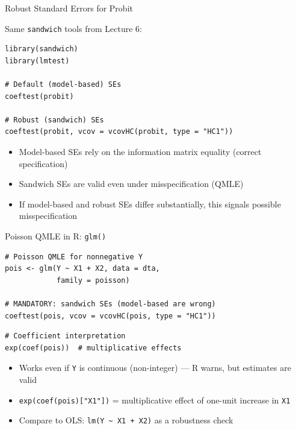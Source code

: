 \documentclass[aspectratio=169, handout, t]{beamer}
\numberwithin{equation}{section}
\begin{document}

\begin{frame}[fragile]{Robust Standard Errors for Probit}

Same \texttt{sandwich} tools from Lecture 6:

\begin{lstlisting}
library(sandwich)
library(lmtest)

# Default (model-based) SEs
coeftest(probit)

# Robust (sandwich) SEs
coeftest(probit, vcov = vcovHC(probit, type = "HC1"))
\end{lstlisting}

\pause

\bigskip

\begin{itemize}
    \item Model-based SEs rely on the information matrix equality (correct specification)
    \item Sandwich SEs are valid even under misspecification (QMLE)
    \item If model-based and robust SEs differ substantially, this signals possible misspecification
\end{itemize}

\end{frame}


\begin{frame}[fragile]{Poisson QMLE in R: \texttt{glm()}}

\begin{lstlisting}
# Poisson QMLE for nonnegative Y
pois <- glm(Y ~ X1 + X2, data = dta,
            family = poisson)

# MANDATORY: sandwich SEs (model-based are wrong)
coeftest(pois, vcov = vcovHC(pois, type = "HC1"))
\end{lstlisting}

\pause

\bigskip

\begin{lstlisting}
# Coefficient interpretation
exp(coef(pois))  # multiplicative effects
\end{lstlisting}

\pause

\bigskip

\begin{itemize}
    \item Works even if \texttt{Y} is continuous (non-integer) --- R warns, but estimates are valid
    \item \texttt{exp(coef(pois)["X1"])} = multiplicative effect of one-unit increase in \texttt{X1}
    \item Compare to OLS: \texttt{lm(Y \~{} X1 + X2)} as a robustness check
\end{itemize}

\end{frame}
\end{document}
